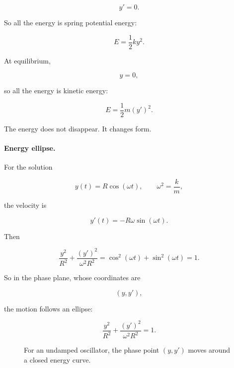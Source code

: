 \[
y'=0.
\]

So all the energy is spring potential energy:

\[
E=\frac12ky^2.
\]

At equilibrium,

\[
y=0,
\]

so all the energy is kinetic energy:

\[
E=\frac12m(y')^2.
\]

The energy does not disappear.  It changes form.

\paragraph{Energy ellipse.}
For the solution

\[
y(t)=R\cos(\omega t),
\qquad
\omega^2=\frac{k}{m},
\]

the velocity is

\[
y'(t)=-R\omega\sin(\omega t).
\]

Then

\[
\frac{y^2}{R^2}+\frac{(y')^2}{\omega^2R^2}
=
\cos^2(\omega t)+\sin^2(\omega t)
=
1.
\]

So in the phase plane, whose coordinates are

\[
(y,y'),
\]

the motion follows an ellipse:

\[
\boxed{
\frac{y^2}{R^2}+\frac{(y')^2}{\omega^2R^2}=1.
}
\]

\begin{figure}[h]
\centering
{}
\caption{For an undamped oscillator, the phase point \((y,y')\) moves around a closed energy curve.}
\label{fig:phase-plane-energy-ellipse}
\end{figure}

